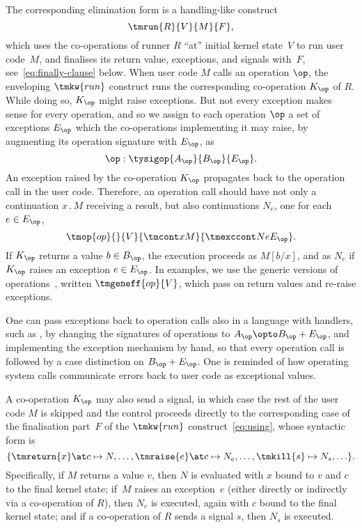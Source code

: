 The corresponding elimination form is a handling-like construct
%
\begin{equation}
  \label{eq:using}
  \tmrun{R}{V}{M}{F}, 
\end{equation}
%
which uses the co-operations of runner $R$ ``at'' initial kernel state~$V$ to
run user code~$M$, and finalises its return value, exceptions, and signals
with~$F$, see~\eqref{eq:finally-clause} below.
%
When user code $M$ calls an operation $\op$, the enveloping $\tmkw{run}$ construct runs the
corresponding co-operation $K_\op$ of $R$. While doing so, $K_\op$ might raise 
exceptions. But not every exception makes sense for every operation, and so
we assign to each operation $\op$ a set of exceptions $E_\op$ which the
co-operations implementing it may raise, by augmenting its operation signature with $E_\op$, as 
%
\begin{equation*}
  \op : \tysigop{A_\op}{B_\op}{E_\op}.
\end{equation*}
%
An exception raised by the co-operation $K_\op$ propagates back to the operation call in
the user code. Therefore, an operation call should have not only a continuation $x\,.\,M$
receiving a result, but also continuations $N_e$, one for each $e \in E_\op$,
%
\begin{equation*}
  \tmop{op}{}{V}{\tmcont x M}{\tmexccont N e {E_\op}}.
\end{equation*}
%
If $K_\op$ returns a value $b \in B_\op$, the execution proceeds 
as $M[b/x]$, and as $N_e$ if $K_\op$ raises an exception 
$e \in E_\op$. In examples, we use the generic versions of 
operations~\cite{Plotkin:AlgOperations}, written $\tmgeneff{op}{V}$,
which pass on return values and re-raise exceptions.

One can pass exceptions back to operation calls also in 
a language with handlers, such as , by 
changing the signatures of operations to
$A_\op \opto B_\op + E_\op$, and implementing 
the exception mechanism by hand, so that every
operation call is followed by a case distinction on $B_\op + E_\op$.
One is reminded of how operating system calls communicate 
errors back to user code as exceptional values.

A co-operation $K_\op$ may also send a signal, in which case the rest of the user code $M$
is skipped and the control proceeds directly to the corresponding case of the finalisation part~$F$ of the
$\tmkw{run}$ construct~\eqref{eq:using}, whose syntactic form is
%
\begin{equation}
  \label{eq:finally-clause}%
  \{ \tmreturn{x} \at c \mapsto N,
     \ldots, \tmraise{e} \at c \mapsto N_e,
     \ldots, \tmkill{s} \mapsto N_s,
     \ldots
  \}.
\end{equation}
%
Specifically, if $M$ returns a value $v$, then $N$ is evaluated with $x$ bound
to $v$ and $c$ to the final kernel state; if~$M$ raises an
exception~$e$ (either directly or indirectly via a co-operation of $R$), 
then $N_e$ is executed, again with $c$ bound to the final kernel state; and 
if a co-operation of $R$ sends a signal $s$, then $N_s$ is executed.

